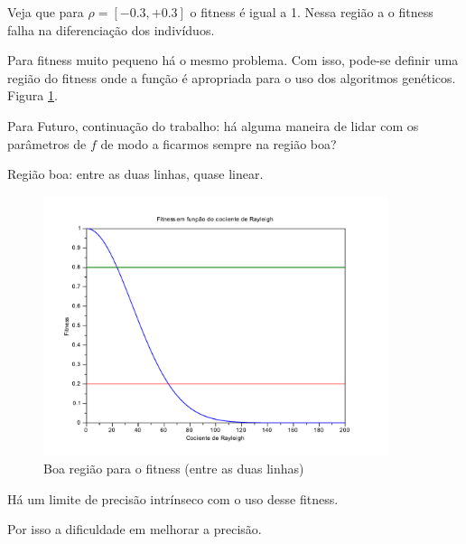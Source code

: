 	Veja que para $\rho = [-0.3,+0.3]$ o fitness é igual a 1. Nessa região a o fitness falha na diferenciação dos indivíduos.
	
	Para fitness muito pequeno há o mesmo problema. Com isso, pode-se definir uma região do fitness onde a função é apropriada para o uso dos algoritmos genéticos. Figura \ref{fig:fitness_boaRegiao}.
	
	Para Futuro, continuação do trabalho: há alguma maneira de lidar com os parâmetros de $f$ de modo a ficarmos sempre na região boa?
	
	Região boa: entre as duas linhas, quase linear.
		
	\begin{figure}[htbp]
		\centering
			\includegraphics[width=0.90\textwidth]{figs/resultados/fitness_boaRegiao.pdf}
		\caption{Boa região para o fitness (entre as duas linhas)}
		\label{fig:fitness_boaRegiao}
	\end{figure}
	
	Há um limite de precisão intrínseco com o uso desse fitness.
	
	Por isso a dificuldade em melhorar a precisão.
	
